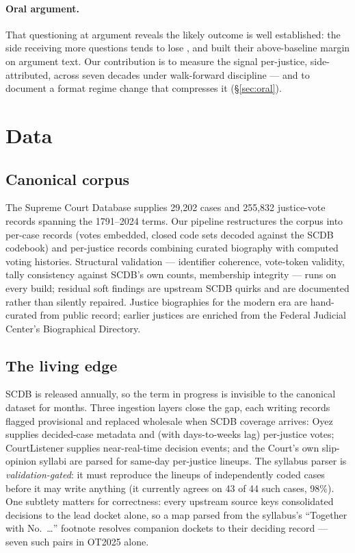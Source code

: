 \documentclass[11pt]{article}
\begin{document}
\paragraph{Oral argument.} That questioning at argument reveals the likely
outcome is well established: the side receiving more questions tends to lose
\citep{johnson2009, epsteinlandesposner2010}, and \citet{kaufman2019} built
their above-baseline margin on argument text. Our contribution is to measure
the signal per-justice, side-attributed, across seven decades under
walk-forward discipline --- and to document a format regime change that
compresses it (\S\ref{sec:oral}).

\section{Data}\label{sec:data}

\subsection{Canonical corpus}

The Supreme Court Database \citep{scdb2025} supplies 29{,}202 cases and 255{,}832
justice-vote records spanning the 1791--2024 terms. Our pipeline restructures the
corpus into per-case records (votes embedded, closed code sets decoded against
the SCDB codebook) and per-justice records combining curated biography with
computed voting histories. Structural validation --- identifier coherence,
vote-token validity, tally consistency against SCDB's own counts, membership
integrity --- runs on every build; residual soft findings are upstream SCDB
quirks and are documented rather than silently repaired. Justice biographies for
the modern era are hand-curated from public record; earlier justices are
enriched from the Federal Judicial Center's Biographical Directory.

\subsection{The living edge}

SCDB is released annually, so the term in progress is invisible to the canonical
dataset for months. Three ingestion layers close the gap, each writing records
flagged provisional and replaced wholesale when SCDB coverage arrives: Oyez
\citep{oyez} supplies decided-case metadata and (with days-to-weeks lag)
per-justice votes; CourtListener \citep{courtlistener} supplies near-real-time
decision events; and the Court's own slip-opinion syllabi are parsed for
same-day per-justice lineups. The syllabus parser is \emph{validation-gated}: it
must reproduce the lineups of independently coded cases before it may write
anything (it currently agrees on 43 of 44 such cases, 98\%). One subtlety
matters for correctness: every upstream source keys consolidated decisions to
the lead docket alone, so a map parsed from the syllabus's ``Together with
No.~\ldots'' footnote resolves companion dockets to their deciding record ---
seven such pairs in OT2025 alone.
\end{document}
